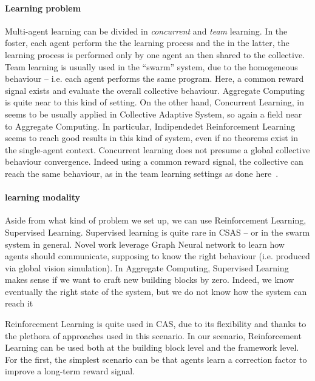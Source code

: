 \documentclass[
  twocolumn,
]{ceurart}
\begin{document}
\paragraph{Learning problem} Multi-agent learning can be
 divided in \textit{concurrent} and \textit{team} learning. In the foster, each agent perform the 
 the learning process and the in the latter, the learning process is performed only by one agent an then 
 shared to the collective.
 Team learning is usually used in the ``swarm'' system, due to the homogeneous behaviour -- i.e. each agent performs the same program. 
 Here, a common reward signal exists and evaluate the overall collective behaviour.
 Aggregate Computing is quite near to this kind of setting.
 On the other hand, Concurrent Learning, in \cite{csas-and-marl} seems to be usually applied in Collective
 Adaptive System, so again a field near to Aggregate Computing. 
 In particular, Indipendedet Reinforcement Learning seems to reach good results in this kind of system, even if no theorems exist in the single-agent context.
 Concurrent learning does not presume a global collective behaviour convergence. Indeed using a common reward signal,
 the collective can reach the same behaviour, as in the team learning settings as done here~\cite{iima2008swarm}.

\paragraph{learning modality}
Aside from what kind of problem we set up, we can use Reinforcement Learning, Supervised Learning.
 Supervised learning is quite rare in CSAS -- or in the swarm system in general.
Novel work leverage Graph Neural network to learn how agents should communicate, supposing to know the right behaviour (i.e. produced via global vision simulation).
 In Aggregate Computing, Supervised Learning makes sense if we want to craft new building blocks by zero. 
 Indeed, we know eventually the right state of the system, but we do not know how the system can reach it

 Reinforcement Learning is quite used in CAS, 
 due to its flexibility and thanks to the plethora of approaches used in this scenario.
 In our scenario, Reinforcement Learning can be used both at the building block level and the framework level.
 For the first, the simplest scenario can be that agents learn a correction factor to improve a long-term
 reward signal.
 
\end{document}

